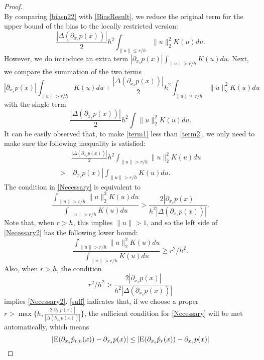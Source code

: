 \documentclass[aos,preprint]{imsart}
\theoremstyle{remark}
\begin{document}
\begin{appendix}
\begin{proof}
\[\] 
By comparing \eqref{biasn22} with \eqref{BiasResult}, we reduce the original term for the upper bound of the bias to the locally restricted version:
\[
\frac{|\Delta(\partial_{x_s}p(x))|}{2} h^2 \int_{\|u\|\leq r/h } \|u\|_2^2 K(u) du.
\] 
However, we do introduce an extra term $|\partial_{x_s} p(x)| \int_{\|u\|> r/h} K(u) du$. 
Next, we compare the summation of the two terms 
\begin{equation}\label{term1}
|\partial_{x_s} p(x)| \int_{\|u\|> r/h} K(u) du+ \frac{|\Delta(\partial_{x_s}p(x))|}{2} h^2 \int_{\|u\|\leq r/h } \|u\|_2^2 K(u) du
\end{equation}
with the single term
\begin{equation}\label{term2}
\frac{|\Delta(\partial_{x_s}p(x))|}{2} h^2 \int \|u\|_2^2 K(u) du.
\end{equation}
It can be easily observed that, to make \eqref{term1} less than \eqref{term2}, we only need to make sure the following inequality is satisfied:
\begin{equation}\label{Necessary}
\begin{aligned}
&\frac{|\Delta(\partial_{x_s} p(x))|}{2} h^2 \int_{\|u\|> r /h} \|u\|_2^2 K(u) du\\
 >& |\partial_{x_s} p(x)| \int_{\|u\|> r/h} K(u) du.
\end{aligned}
\end{equation}
The condition in \eqref{Necessary} is equivalent to
\begin{equation}\label{Necessary2}
\frac{\int_{\|u\|> r /h} \|u\|_2^2 K(u) du }{\int_{\|u\|> r/h} K(u) du} > \frac{2|\partial_{x_s} p(x)| }{h^2 |\Delta(\partial_{x_s} p(x))|}.
\end{equation}
Note that, when $r>h$, this implies $\|u\|>1$, and so the left side of \eqref{Necessary2} has the following lower bound:
\begin{equation}\label{necess2}
\frac{ \int_{\|u\|> r /h} \|u\|_2^2 K(u) du}{ \int_{\|u\|> r/h} K(u) du}\geq r^2/h^2.
\end{equation}
Also, when $r>h$, the condition
\begin{equation}\label{suff}
r^2/h^2 > \frac{2|\partial_{x_s} p(x)| }{h^2 |\Delta(\partial_{x_s} p(x))|}
\end{equation}
implies \eqref{Necessary2}. \eqref{suff} indicates that, if we choose a proper $r>\max\{h,\frac{2|\partial_{x_s} p(x)|}{ |\Delta(\partial_{x_s} p(x))|}\}$, the sufficient  condition for \eqref{Necessary} will be met automatically, which means
\begin{equation}\label{end1}
|{\rm E}( \partial_{x_s}  \hat{p}_{r,h}(x)) -  \partial_{x_s } p(x)| \leq |{\rm E}( \partial_{x_s}  \hat{p}_{r}(x)) -  \partial_{x_s } p(x)|
\end{equation}


\end{proof}
\end{appendix}
\end{document}
